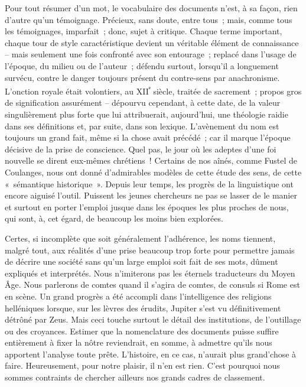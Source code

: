 \documentclass[french,twoside]{book} %
\begin{document}
\noindent Pour tout résumer d’un mot, le vocabulaire des documents n’est, à sa façon, rien d’autre qu’un témoignage. Précieux, sans doute, entre tous ; mais, comme tous les témoignages, imparfait ; donc, sujet à critique. Chaque terme important, chaque tour de style caractéristique devient un véritable élément de connaissance – mais seulement une fois confronté avec son entourage ; replacé dans l’usage de l’époque, du milieu ou de l’auteur ; défendu surtout, lorsqu’il a longuement survécu, contre le danger toujours présent du contre‑sens par anachronisme. L’onction royale était volontiers, au XII\textsuperscript{ᵉ} siècle, traitée de sacrement ; propos gros de signification assurément – dépourvu cependant, à cette date, de la valeur singulièrement plus forte que lui attribuerait, aujourd’hui, une théologie raidie dans ses définitions et, par suite, dans son lexique. L’avè­nement du nom est toujours un grand fait, même si la chose avait précédé ; car il marque l’époque décisive de la prise de conscience. Quel pas, le jour où les adeptes d’une foi nouvelle se dirent eux‑mêmes chrétiens ! Certains de nos aînés, comme Fustel de Coulanges, nous ont donné d’admi­rables modèles de cette étude des sens, de cette « sémantique historique ». Depuis leur temps, les progrès de la linguistique ont encore aiguisé l’outil. Puissent les jeunes chercheurs ne pas se lasser de le manier et surtout en porter l’emploi jusque dans les époques les plus proches de nous, qui sont, à, cet égard, de beaucoup les moins bien explorées.\par
Certes, si incomplète que soit généralement l’adhérence, les noms tiennent, malgré tout, aux réalités d’une prise beaucoup trop forte pour permettre jamais de décrire une société sans qu’un large emploi soit fait de ses mots, dûment expliqués et interprétés. Nous n’imiterons pas les éternels traducteurs du Moyen Âge. Nous parlerons de comtes quand il s’agira de comtes, de consuls si Rome est en scène. Un grand progrès  
\label{p86} a été accompli dans l’intelligence des religions helléniques lorsque, sur les lèvres des érudits, Jupiter s’est vu définitivement détrôné par Zeus. Mais ceci touche surtout le détail des institutions, de l’outillage ou des croyances. Estimer que la nomenclature des documents puisse suffire entièrement à fixer la nôtre reviendrait, en somme, à admettre qu’ils nous apportent l’analyse toute prête. L’histoire, en ce cas, n’aurait plus grand’chose à faire. Heureusement, pour notre plaisir, il n’en est rien. C’est pourquoi nous sommes contraints de chercher ailleurs nos grands cadres de classement.\par
\end{document}
